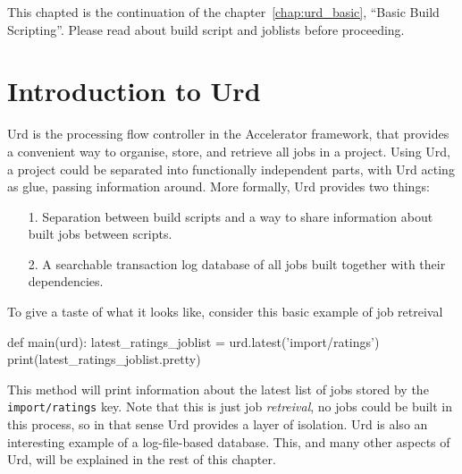 
\label{chap:urd}

This chapted is the continuation of the chapter~\ref{chap:urd_basic},
``Basic Build Scripting''.  Please read about build script and
joblists before proceeding.


\section{Introduction to Urd}

Urd is the processing flow controller in the Accelerator framework,
that provides a convenient way to organise, store, and retrieve all
jobs in a project.  Using Urd, a project could be separated into
functionally independent parts, with Urd acting as glue, passing
information around.  More formally, Urd provides two things:
\begin{itemize}
\item[1.] Separation between build scripts
        and a way to share information about built jobs between scripts.
\item[2.] A searchable transaction log database of all jobs built together with their dependencies.
\end{itemize}
To give a taste of what it looks like, consider this basic example of
job retreival
\begin{python}
def main(urd):
    latest_ratings_joblist = urd.latest('import/ratings')
    print(latest_ratings_joblist.pretty)
\end{python}
This method will print information about the latest list of jobs
stored by the \texttt{import/ratings} key.  Note that this is just
job \textsl{retreival}, no jobs could be built in this process, so in
that sense Urd provides a layer of isolation.  Urd is also an
interesting example of a log-file-based database.  This, and many
other aspects of Urd, will be explained in the rest of this chapter.

